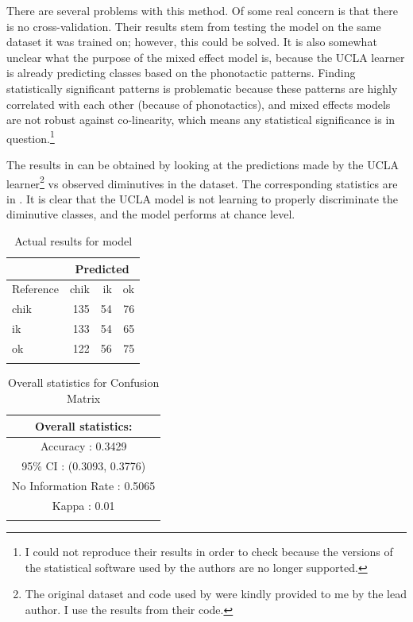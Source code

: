 \largerpage[-1]
There are several problems with this method. Of some real concern is that there is no cross-validation. Their results stem from testing the model on the same dataset it was trained on; however, this could be solved. It is also somewhat unclear what the purpose of the mixed effect model is, because the UCLA learner is already predicting classes based on the phonotactic patterns. Finding statistically significant patterns is problematic because these patterns are highly correlated with each other (because of phonotactics), and mixed effects models are not robust against co-linearity, which means any statistical significance is in question.\footnote{I could not reproduce their results in order to check because the versions of the statistical software used by the authors are no longer supported.}

The results in  can be obtained by looking at the predictions made by the UCLA learner\footnote{The original dataset and code used by \textcite{Gouskova.2015} were kindly provided to me by the lead author. I use the results from their code.} vs observed diminutives in the dataset. The corresponding statistics are in . It is clear that the UCLA model is not learning to properly discriminate the diminutive classes, and the model performs at chance level.

\begin{table}
  \centering
  \begin{tabular}{lrrr}
    \lsptoprule
    & \multicolumn{3}{c}{Predicted} \\
    \midrule
    Reference & chik & ik & ok                \\
    chik      & 135  & 54 & 76                \\
    ik        & 133  & 54 & 65                \\
    ok        & 122  & 56 & 75                \\
    \lspbottomrule
  \end{tabular}
  \caption{Actual results for  model}\label{tab:test-gkn-model}
\end{table}

\begin{table}
  \centering
  \begin{tabular}{c}
    \lsptoprule
    Overall statistics:          \\
    \midrule
    Accuracy : 0.3429\\
    95\% CI : (0.3093, 0.3776)\\
    No Information Rate : 0.5065\\
    Kappa : 0.01\\
    \lspbottomrule
  \end{tabular}
  \caption{Overall statistics for Confusion Matrix }\label{tab:test-gkn-stats}
\end{table}

